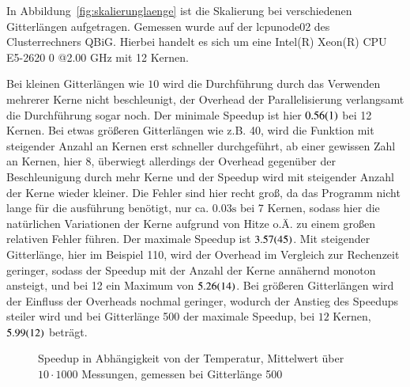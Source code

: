	In Abbildung~\ref{fig:skalierunglaenge} ist die Skalierung bei verschiedenen Gitterlängen aufgetragen. Gemessen wurde auf der lcpunode02 des Clusterrechners QBiG. Hierbei handelt es sich um eine Intel(R) Xeon(R) CPU E5-2620 0 @2.00 GHz mit 12 Kernen.%
	
	Bei kleinen Gitterlängen wie $10$ wird die Durchführung durch das Verwenden mehrerer Kerne nicht beschleunigt, der Overhead der Parallelisierung verlangsamt die Durchführung sogar noch. Der minimale Speedup ist hier $\num{0,56\pm0,01}$ bei 12 Kernen. Bei etwas größeren Gitterlängen wie z.{}B.{} 40, wird die Funktion mit steigender Anzahl an Kernen erst schneller durchgeführt, ab einer gewissen Zahl an Kernen, hier $8$, überwiegt allerdings der Overhead gegenüber der Beschleunigung durch mehr Kerne und der Speedup wird mit steigender Anzahl der Kerne wieder kleiner. Die Fehler sind hier recht groß, da das Programm nicht lange für die ausführung benötigt, nur ca.{} $\num{0,03}\si{\second}$ bei 7 Kernen, sodass hier die natürlichen Variationen der Kerne aufgrund von Hitze o.{}Ä.{} zu einem großen relativen Fehler führen. Der maximale Speedup ist $\num{3,57\pm0,45}$. Mit steigender Gitterlänge, hier im Beispiel 110, wird der Overhead im Vergleich zur Rechenzeit geringer, sodass der Speedup mit der Anzahl der Kerne annähernd monoton ansteigt, und bei 12 ein Maximum von $\num{5,26\pm0,14}$.
	Bei größeren Gitterlängen wird der Einfluss der Overheads nochmal geringer, wodurch der Anstieg des Speedups steiler wird und bei Gitterlänge 500 der maximale Speedup, bei $12$ Kernen, $\num{5,99\pm0,12}$ beträgt.
 	
	
	\begin{figure}[htbp]
		
		\caption[Speedup in Abhängigkeit von der Temperatur]{Speedup in Abhängigkeit von der Temperatur, Mittelwert über $10 \cdot 1000$ Messungen, gemessen bei Gitterlänge 500}
		\label{fig:skalierungtemp}
	\end{figure}
		

